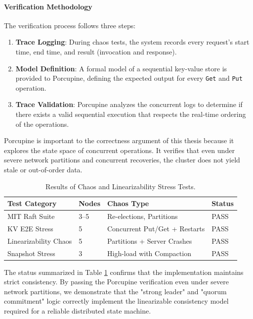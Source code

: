 \paragraph{Verification Methodology}
The verification process follows three steps:
\begin{enumerate}
    \item \textbf{Trace Logging}: During chaos tests, the system records every request's start time, end time, and result (invocation and response).
    \item \textbf{Model Definition}: A formal model of a sequential key-value store is provided to Porcupine, defining the expected output for every \texttt{Get} and \texttt{Put} operation.
    \item \textbf{Trace Validation}: Porcupine analyzes the concurrent logs to determine if there exists a valid sequential execution that respects the real-time ordering of the operations.
\end{enumerate}

Porcupine is important to the correctness argument of this thesis because it explores the state space of concurrent operations. It verifies that even under severe network partitions and concurrent recoveries, the cluster does not yield stale or out-of-order data.

\begin{table}[h]
\centering
\caption{Results of Chaos and Linearizability Stress Tests.}
\label{tab:test_results}
\begin{tabular}{|l|l|l|l|}
\hline
\textbf{Test Category} & \textbf{Nodes} & \textbf{Chaos Type} & \textbf{Status} \\ \hline
MIT Raft Suite & 3--5 & Re-elections, Partitions & PASS \\ \hline
KV E2E Stress & 5 & Concurrent Put/Get + Restarts & PASS \\ \hline
Linearizability Chaos & 5 & Partitions + Server Crashes & PASS \\ \hline
Snapshot Stress & 3 & High-load with Compaction & PASS \\ \hline
\end{tabular}
\end{table}

The status summarized in Table \ref{tab:test_results} confirms that the implementation maintains strict consistency. By passing the Porcupine verification even under severe network partitions, we demonstrate that the "strong leader" and "quorum commitment" logic correctly implement the linearizable consistency model required for a reliable distributed state machine.

